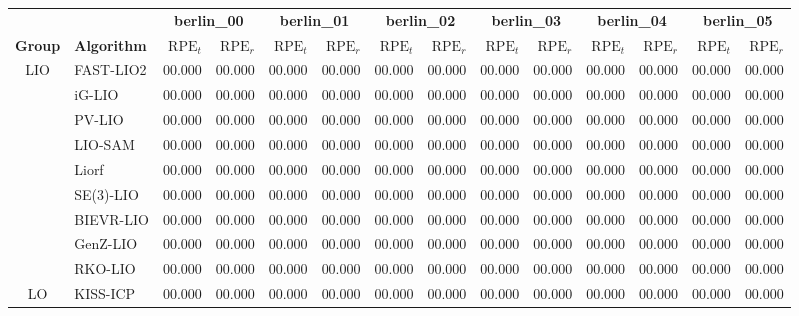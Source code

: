 \documentclass[border=8pt]{standalone}
\begin{document}
\begin{minipage}{22cm}
\centering
\fontsize{9pt}{11pt}\selectfont
\setlength{\tabcolsep}{4pt}
\renewcommand{\arraystretch}{1.2}
\begin{tabular*}{\linewidth}{@{\extracolsep{\fill}}cl|rr|rr|rr|rr|rr|rr@{}}
\toprule[1pt]
 & & \multicolumn{2}{c|}{\textbf{berlin\_00}} & \multicolumn{2}{c|}{\textbf{berlin\_01}} & \multicolumn{2}{c|}{\textbf{berlin\_02}} & \multicolumn{2}{c|}{\textbf{berlin\_03}} & \multicolumn{2}{c|}{\textbf{berlin\_04}} & \multicolumn{2}{c}{\textbf{berlin\_05}} \\
\textbf{Group} & \textbf{Algorithm} & $\mathrm{RPE}_{t}$ & $\mathrm{RPE}_{r}$ & $\mathrm{RPE}_{t}$ & $\mathrm{RPE}_{r}$ & $\mathrm{RPE}_{t}$ & $\mathrm{RPE}_{r}$ & $\mathrm{RPE}_{t}$ & $\mathrm{RPE}_{r}$ & $\mathrm{RPE}_{t}$ & $\mathrm{RPE}_{r}$ & $\mathrm{RPE}_{t}$ & $\mathrm{RPE}_{r}$ \\
\midrule[0.7pt]
\multirow{9}{*}{LIO} & FAST-LIO2 & 00.000 & 00.000 & 00.000 & 00.000 & 00.000 & 00.000 & 00.000 & 00.000 & 00.000 & 00.000 & 00.000 & 00.000 \\
 & iG-LIO & 00.000 & 00.000 & 00.000 & 00.000 & 00.000 & 00.000 & 00.000 & 00.000 & 00.000 & 00.000 & 00.000 & 00.000 \\
 & PV-LIO & 00.000 & 00.000 & 00.000 & 00.000 & 00.000 & 00.000 & 00.000 & 00.000 & 00.000 & 00.000 & 00.000 & 00.000 \\
 & LIO-SAM & 00.000 & 00.000 & 00.000 & 00.000 & 00.000 & 00.000 & 00.000 & 00.000 & 00.000 & 00.000 & 00.000 & 00.000 \\
 & Liorf & 00.000 & 00.000 & 00.000 & 00.000 & 00.000 & 00.000 & 00.000 & 00.000 & 00.000 & 00.000 & 00.000 & 00.000 \\
 & SE(3)-LIO & 00.000 & 00.000 & 00.000 & 00.000 & 00.000 & 00.000 & 00.000 & 00.000 & 00.000 & 00.000 & 00.000 & 00.000 \\
 & BIEVR-LIO & 00.000 & 00.000 & 00.000 & 00.000 & 00.000 & 00.000 & 00.000 & 00.000 & 00.000 & 00.000 & 00.000 & 00.000 \\
 & GenZ-LIO & 00.000 & 00.000 & 00.000 & 00.000 & 00.000 & 00.000 & 00.000 & 00.000 & 00.000 & 00.000 & 00.000 & 00.000 \\
 & RKO-LIO & 00.000 & 00.000 & 00.000 & 00.000 & 00.000 & 00.000 & 00.000 & 00.000 & 00.000 & 00.000 & 00.000 & 00.000 \\
\midrule[1pt]
\multirow{4}{*}{LO} & KISS-ICP & 00.000 & 00.000 & 00.000 & 00.000 & 00.000 & 00.000 & 00.000 & 00.000 & 00.000 & 00.000 & 00.000 & 00.000 \\

\end{tabular*}
\end{minipage}
\end{document}
